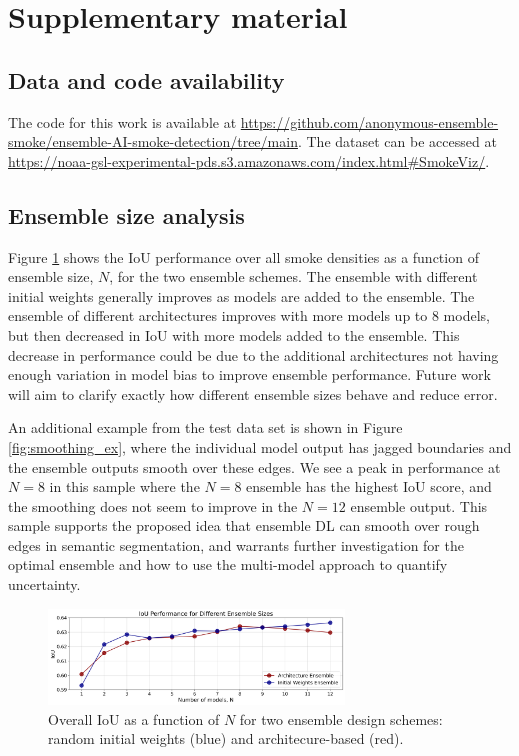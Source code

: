 \documentclass{article}
\begin{document}
\newpage

 

\section{Supplementary material}
\subsection{Data and code availability}\label{sec:data-code} The code for this work is available at \url{https://github.com/anonymous-ensemble-smoke/ensemble-AI-smoke-detection/tree/main}. The dataset can be accessed at \url{https://noaa-gsl-experimental-pds.s3.amazonaws.com/index.html#SmokeViz/}.

\subsection{Ensemble size analysis}\label{sec:ens-size} 
Figure \ref{fig:ensemble_size_plot} shows the IoU performance over all smoke densities as a function of ensemble size, $N$, for the two ensemble schemes. The ensemble with different initial weights generally improves as models are added to the ensemble. The ensemble of different architectures improves with more models up to 8 models, but then decreased in IoU with more models added to the ensemble. This decrease in performance could be due to the additional architectures not having enough variation in model bias to improve ensemble performance. Future work will aim to clarify exactly how different ensemble sizes behave and reduce error. 

An additional example from the test data set is shown in Figure \ref{fig:smoothing_ex}, where the individual model output has jagged boundaries and the ensemble outputs smooth over these edges. We see a peak in performance at $N=8$ in this sample where the $N=8$ ensemble has the highest IoU score, and the smoothing does not seem to improve in the $N=12$ ensemble output. This sample supports the proposed idea that ensemble DL can smooth over rough edges in semantic segmentation, and warrants further investigation for the optimal ensemble and how to use the multi-model approach to quantify uncertainty. 
\begin{figure}
    \centering
    \includegraphics[width=0.70\textwidth]{ensemble_size_plot.png}
    \caption{\RaggedRight Overall IoU as a function of $N$ for two ensemble design schemes: random initial weights (blue) and architecure-based (red).}
    \label{fig:ensemble_size_plot}
\end{figure}
\end{document}
